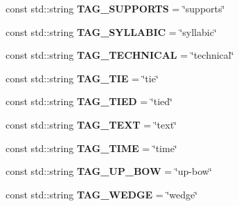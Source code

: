 \begin{DoxyCompactItemize}
\item 
\hypertarget{namespacesinsy_a9eff640bb16c207f29be8ec6c4d8eaee}{const std\-::string {\bfseries \-T\-A\-G\-\_\-\-S\-U\-P\-P\-O\-R\-T\-S} = \char`\"{}supports\char`\"{}}\label{namespacesinsy_a9eff640bb16c207f29be8ec6c4d8eaee}

\item 
\hypertarget{namespacesinsy_a1c690b95f12274d671ee50bda45b54c8}{const std\-::string {\bfseries \-T\-A\-G\-\_\-\-S\-Y\-L\-L\-A\-B\-I\-C} = \char`\"{}syllabic\char`\"{}}\label{namespacesinsy_a1c690b95f12274d671ee50bda45b54c8}

\item 
\hypertarget{namespacesinsy_ae2f4c86612a8bbcc35b901c91c2dc895}{const std\-::string {\bfseries \-T\-A\-G\-\_\-\-T\-E\-C\-H\-N\-I\-C\-A\-L} = \char`\"{}technical\char`\"{}}\label{namespacesinsy_ae2f4c86612a8bbcc35b901c91c2dc895}

\item 
\hypertarget{namespacesinsy_a5ce39e1eb001ee00676557a6d2ef5e98}{const std\-::string {\bfseries \-T\-A\-G\-\_\-\-T\-I\-E} = \char`\"{}tie\char`\"{}}\label{namespacesinsy_a5ce39e1eb001ee00676557a6d2ef5e98}

\item 
\hypertarget{namespacesinsy_a85cdd7c9e0747c6a1ccaab7c1047480b}{const std\-::string {\bfseries \-T\-A\-G\-\_\-\-T\-I\-E\-D} = \char`\"{}tied\char`\"{}}\label{namespacesinsy_a85cdd7c9e0747c6a1ccaab7c1047480b}

\item 
\hypertarget{namespacesinsy_a7367d18e522070e5798e08ed0c20ee51}{const std\-::string {\bfseries \-T\-A\-G\-\_\-\-T\-E\-X\-T} = \char`\"{}text\char`\"{}}\label{namespacesinsy_a7367d18e522070e5798e08ed0c20ee51}

\item 
\hypertarget{namespacesinsy_a34f9418ae27a98e0ec2bd23ffb6ab880}{const std\-::string {\bfseries \-T\-A\-G\-\_\-\-T\-I\-M\-E} = \char`\"{}time\char`\"{}}\label{namespacesinsy_a34f9418ae27a98e0ec2bd23ffb6ab880}

\item 
\hypertarget{namespacesinsy_a8e01fb3e35df2d5db679e91a98e02902}{const std\-::string {\bfseries \-T\-A\-G\-\_\-\-U\-P\-\_\-\-B\-O\-W} = \char`\"{}up-\/bow\char`\"{}}\label{namespacesinsy_a8e01fb3e35df2d5db679e91a98e02902}

\item 
\hypertarget{namespacesinsy_aff0474d344ffcf4459fb8f664f334ae4}{const std\-::string {\bfseries \-T\-A\-G\-\_\-\-W\-E\-D\-G\-E} = \char`\"{}wedge\char`\"{}}\label{namespacesinsy_aff0474d344ffcf4459fb8f664f334ae4}

\end{DoxyCompactItemize}


